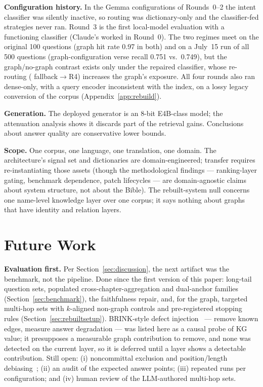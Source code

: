 \textbf{Configuration history.} In the Gemma configurations of
Rounds~0--2 the intent classifier was silently inactive, so routing was
dictionary-only and the classifier-fed strategies never ran. Round~3 is
the first local-model evaluation with a functioning classifier (Claude's
worked in Round~0). The two regimes meet on the original 100 questions
(graph hit rate 0.97 in both) and on a July~15 run of all 500 questions
(graph-configuration verse recall 0.751 vs.\ 0.749), but the
graph/no-graph contrast exists only under the repaired classifier, whose
re-routing ( fallback$\to$R4) increases the graph's exposure. All four rounds also ran dense-only, with a query encoder inconsistent with the index, on a lossy legacy conversion of the corpus (Appendix~\ref{app:rebuild}).

\textbf{Generation.} The deployed generator is an 8-bit E4B-class
model; the attenuation analysis shows it discards part of the retrieval
gains. Conclusions about answer quality are conservative lower bounds.

\textbf{Scope.} One corpus, one language, one translation, one domain.
The architecture's signal set and dictionaries are domain-engineered;
transfer requires re-instantiating those assets (though the
methodological findings --- ranking-layer gating, benchmark dependence,
patch lifecycles --- are domain-agnostic claims about system structure,
not about the Bible). The rebuilt-system null concerns one name-level
knowledge layer over one corpus; it says nothing about graphs that have
identity and relation layers.

\section{Future Work}
\label{sec:future}

\textbf{Evaluation first.} Per Section~\ref{sec:discussion}, the next
artifact was the benchmark, not the pipeline. Done since the first
version of this paper: long-tail question sets, populated
cross-chapter-aggregation and dual-anchor families
(Section~\ref{sec:benchmark}), the faithfulness repair, and, for the
graph, targeted multi-hop sets with $k$-aligned non-graph controls and
pre-registered stopping rules (Section~\ref{sec:rebuiltsetup}).
BRINK-style defect injection~\cite{zhou2025brink} --- remove known
edges, measure answer degradation --- was listed here as a causal probe
of KG value; it presupposes a measurable graph contribution to remove,
and none was detected on the current layer, so it is deferred until a
layer shows a detectable contribution.
Still open: (i) noncommittal exclusion and position/length
debiasing~\cite{zeng2025unbiased}; (ii) an audit of the expected answer
points; (iii) repeated runs per configuration; and (iv) human review of
the LLM-authored multi-hop sets.

